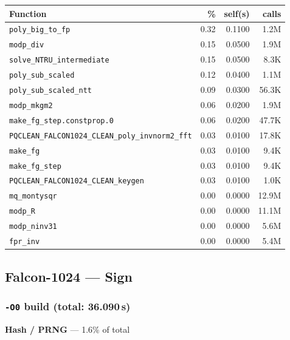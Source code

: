 \documentclass[11pt,a4paper]{article}
\begin{document}
\begin{longtable}{p{7.5cm}rrr}
\toprule
Function & \% & self(s) & calls \\
\midrule
\endhead
  \texttt{poly\_big\_to\_fp} & 0.32 & 0.1100 & 1.2M \\
  \texttt{modp\_div} & 0.15 & 0.0500 & 1.9M \\
  \texttt{solve\_NTRU\_intermediate} & 0.15 & 0.0500 & 8.3K \\
  \texttt{poly\_sub\_scaled} & 0.12 & 0.0400 & 1.1M \\
  \texttt{poly\_sub\_scaled\_ntt} & 0.09 & 0.0300 & 56.3K \\
  \texttt{modp\_mkgm2} & 0.06 & 0.0200 & 1.9M \\
  \texttt{make\_fg\_step.constprop.0} & 0.06 & 0.0200 & 47.7K \\
  \texttt{PQCLEAN\_FALCON1024\_CLEAN\_poly\_invnorm2\_fft} & 0.03 & 0.0100 & 17.8K \\
  \texttt{make\_fg} & 0.03 & 0.0100 & 9.4K \\
  \texttt{make\_fg\_step} & 0.03 & 0.0100 & 9.4K \\
  \texttt{PQCLEAN\_FALCON1024\_CLEAN\_keygen} & 0.03 & 0.0100 & 1.0K \\
  \texttt{mq\_montysqr} & 0.00 & 0.0000 & 12.9M \\
  \texttt{modp\_R} & 0.00 & 0.0000 & 11.1M \\
  \texttt{modp\_ninv31} & 0.00 & 0.0000 & 5.6M \\
  \texttt{fpr\_inv} & 0.00 & 0.0000 & 5.4M \\
\bottomrule
\end{longtable}

\subsection{Falcon-1024 --- Sign}

\subsubsection*{\texttt{-O0} build (total: 36.090\,s)}

\noindent\colorbox{hashcolor}{\strut \textbf{Hash / PRNG} --- 1.6\% of total}
\vspace{2pt}
\end{document}
